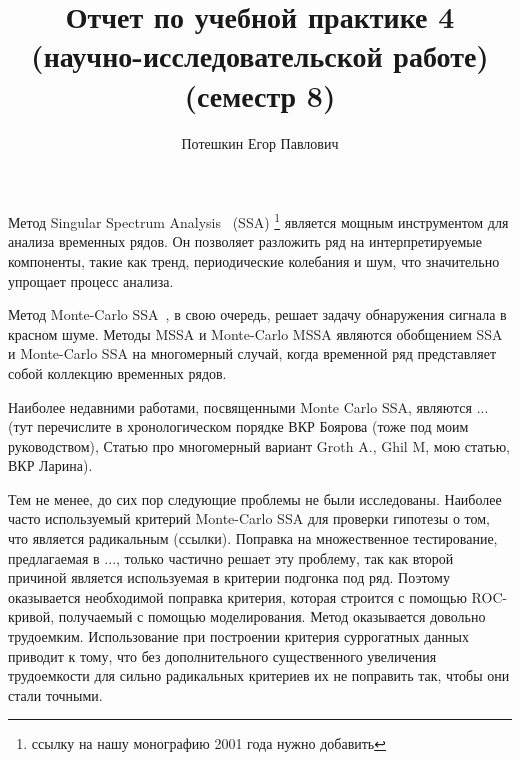 \documentclass[specialist,
substylefile = spbu_report.rtx,
subf,href,colorlinks=true, 12pt]{disser}
\theoremstyle{definition}
\begin{document}
\setcounter{tocdepth}{2}
%
%

\title{Отчет по учебной практике 4 (научно-исследовательской работе) (семестр 8)}


\author{Потешкин Егор Павлович}


\date{\number\year}

\maketitle
\tableofcontents
\intro
Метод Singular Spectrum Analysis~\cite{SSA_broom} (SSA)
\footnote{ссылку на нашу монографию 2001 года нужно добавить}
 является мощным инструментом для анализа временных рядов. Он позволяет разложить ряд на интерпретируемые компоненты, такие как тренд, периодические колебания и шум, что значительно упрощает процесс анализа. 
 
 Метод Monte-Carlo SSA~\cite{Allen}, в свою очередь, решает задачу обнаружения сигнала в красном шуме. Методы MSSA и Monte-Carlo MSSA являются обобщением SSA и Monte-Carlo SSA на многомерный случай, когда временной ряд представляет собой коллекцию временных рядов.
 
 Наиболее недавними работами, посвященными Monte Carlo SSA, являются ... (тут перечислите в хронологическом порядке ВКР Боярова (тоже под моим руководством), Статью про многомерный вариант Groth A., Ghil M, мою статью, ВКР Ларина).
 
  Тем не менее, до сих пор следующие проблемы не были исследованы. Наиболее часто используемый критерий Monte-Carlo SSA для проверки гипотезы о том, что является радикальным (ссылки). Поправка на множественное тестирование, предлагаемая в ..., только частично решает эту проблему, так как второй причиной является используемая в критерии подгонка под ряд. Поэтому оказывается необходимой поправка критерия, которая строится с помощью ROC-кривой, получаемый с помощью моделирования. Метод оказывается довольно трудоемким.
  Использование при построении критерия суррогатных данных приводит к тому, что без дополнительного существенного увеличения трудоемкости для сильно радикальных критериев их не поправить так, чтобы они стали точными.
 
\end{document}
